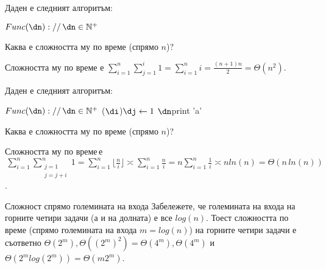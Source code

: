 \begin{problem}
	Даден е следният алгоритъм:
	\begin{pseudocode}
		
		$Func(\dn)://\,\dn\in\mathbb{N}^+$
		\Mybegin
		{
			{
			}
		}
	\end{pseudocode}
	Каква е сложността му по време (спрямо $n$)?
\end{problem}
\begin{solution}
	Сложността му по време е $\sum\limits_{i=1}^n\sum\limits_{j=1}^i1=\sum\limits_{i=1}^n i=\frac{(n+1)n}{2}=\Theta(n^2)$.
\end{solution}\leavevmode\newline

\begin{problem}
	Даден е следният алгоритъм:
	\begin{pseudocode}
		\SetKwData{di}{i}
		\SetKwData{dj}{j}
		\SetKwData{dn}{n}
		
		$Func(\dn)://\,\dn\in\mathbb{N}^+$
		\Mybegin
		{
			\Myfor{$\di\leftarrow1$ \KwTo $\dn$}
			{
				\Myfor(\Withstep $\di$){$\dj\leftarrow1$ \KwTo $\dn$}{print 'a'\;}
			}
		}
	\end{pseudocode}
	Каква е сложността му по време (спрямо $n$)?
\end{problem}
\begin{solution}
	Сложността му по време$\,$е$\,\sum\limits_{i=1}^n\sum\limits_{\substack{j=1\\j=j+i}}^n1=\sum\limits_{i=1}^n\lfloor\frac ni\rfloor\asymp\sum\limits_{i=1}^n\frac ni=n\sum\limits_{i=1}^n\frac1i\asymp nln(n)=\Theta(n\,ln(n))$.
\end{solution}\leavevmode\newline

\begin{boxremark}{Сложност спрямо големината на входа}{}
	Забележете, че големината на входа на горните четири задачи (а и на долната) е все $log(n)$. Тоест сложността по време (спрямо големината на входа $m=log(n)$) на горните четири задачи е съответно $\Theta(2^m),\Theta((2^m)^2)=\Theta(4^m),\Theta(4^m)$ и $\Theta(2^mlog(2^m))=\Theta(m2^m)$.
\end{boxremark}\leavevmode\newline

